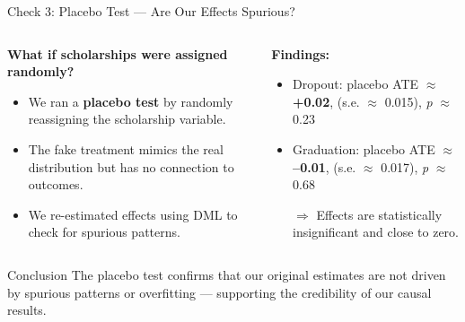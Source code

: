 \documentclass[aspectratio=169]{beamer}
\begin{document}
\begin{frame}{Check 3: Placebo Test — Are Our Effects Spurious?}
\begin{columns}[t]

\begin{column}{0.5\textwidth}
\newline
\textbf{What if scholarships were assigned randomly?}
\begin{itemize}[label=--, itemsep=1pt]
    \item We ran a \textbf{placebo test} by randomly reassigning the scholarship variable.
    \item The fake treatment mimics the real distribution but has no connection to outcomes.
    \item We re-estimated effects using DML to check for spurious patterns.
\end{itemize}

\end{column}

\begin{column}{0.45\textwidth}
\newline
\textbf{Findings:}
\begin{itemize}[label=--, itemsep=1pt]
    \item Dropout: placebo ATE $\approx$ \textbf{+0.02}, (s.e. $\approx$ 0.015), \textit{p} $\approx$ 0.23
    \item Graduation: placebo ATE $\approx$ \textbf{–0.01}, (s.e. $\approx$ 0.017), \textit{p} $\approx$ 0.68
    \item [$\Rightarrow$] Effects are statistically insignificant and close to zero.
\end{itemize}
\end{column}
\end{columns}
\vspace{10pt}
\begin{block}{Conclusion}
The placebo test confirms that our original estimates are not driven by spurious patterns or overfitting — supporting the credibility of our causal results.
\end{block}
\end{frame}
\end{document}
